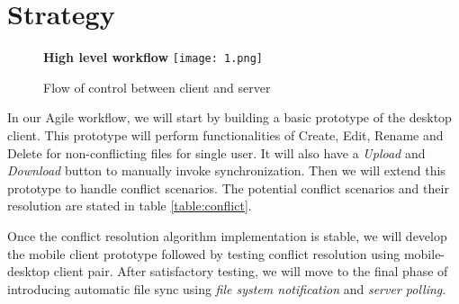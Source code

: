 \documentclass[a4paper]{article}
\begin{document}
{\section{Strategy}
\begin{figure}[H]
	\centering
	\textbf{High level workflow}
	\texttt{[image: 1.png]}
	\caption{Flow of control between client and server}
\end{figure}\par
In our Agile workflow, we will start by building a basic prototype of the desktop client. This prototype will perform functionalities of Create, Edit, Rename and Delete for non-conflicting files for single user. It will also have a \emph{Upload} and \emph{Download} button to manually invoke synchronization. Then we will extend this prototype to handle conflict scenarios. The potential conflict scenarios and their resolution are stated in table \ref{table:conflict}.

Once the conflict resolution algorithm implementation is stable, we will develop the mobile client prototype followed by testing conflict resolution using mobile-desktop client pair. After satisfactory testing, we will move to the final phase of introducing automatic file sync using \emph{file system notification} and \emph{server polling}.

}
\end{document}

